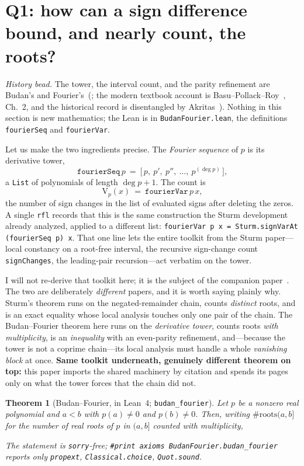 \documentclass[11pt]{article}
\newtheorem{theorem}{Theorem}
\newcommand{\lean}[1]{\texttt{#1}}
\newcommand{\V}{\mathrm{V}}
\newcommand{\keyeq}[1]{\begin{center}\keybox{$\displaystyle #1$}\end{center}}
\begin{document}
\section{Q1: how can a sign difference bound, and nearly count, the roots?}\label{sec:q1}

\emph{History bead.} The tower, the interval count, and the parity refinement are Budan's and
Fourier's~(\cite{budan,fourier}; the modern textbook account is Basu--Pollack--Roy~\cite{bpr}, Ch.~2,
and the historical record is disentangled by Akritas~\cite{akritas}). Nothing in this section is new
mathematics; the Lean is in \lean{BudanFourier.lean}, the definitions \lean{fourierSeq} and
\lean{fourierVar}.

Let us make the two ingredients precise. The \emph{Fourier sequence} of $p$ is its derivative tower,
\[
  \lean{fourierSeq}\,p\ =\ \big[\,p,\ p',\ p'',\ \dots,\ p^{(\deg p)}\,\big],
\]
a \lean{List} of polynomials of length $\deg p + 1$. The count is
\[
  \V_p(x)\ =\ \lean{fourierVar}\,p\,x,
\]
the number of sign changes in the list of evaluated signs after deleting the zeros. A single \lean{rfl}
records that this is the same construction the Sturm development already analyzed, applied to a
different list: \lean{fourierVar p x = Sturm.signVarAt (fourierSeq p) x}. That one line lets the
entire toolkit from the Sturm paper---local constancy on a root-free interval, the recursive
sign-change count \lean{signChanges}, the leading-pair recursion---act verbatim on the tower.

I will not re-derive that toolkit here; it is the subject of the companion paper~\cite{sturmlean}.
The two are deliberately \emph{different} papers, and it is worth saying plainly why. Sturm's theorem
runs on the negated-remainder chain, counts \emph{distinct} roots, and is an exact equality whose
local analysis touches only one pair of the chain. The Budan--Fourier theorem here runs on the
\emph{derivative tower}, counts roots \emph{with multiplicity}, is an \emph{inequality} with an
even-parity refinement, and---because the tower is not a coprime chain---its local analysis must
handle a whole \emph{vanishing block} at once. \textbf{Same toolkit underneath, genuinely different theorem
on top:} this paper imports the shared machinery by citation and spends its pages only on what the
tower forces that the chain did not.

\begin{theorem}[Budan--Fourier, in Lean~4; \lean{budan\_fourier}]\label{thm:bf}
Let $p$ be a nonzero real polynomial and $a<b$ with $p(a)\ne0$ and $p(b)\ne0$. Then, writing
$\#\mathrm{roots}(a,b]$ for the number of real roots of $p$ in $(a,b]$ counted with multiplicity,
\keyeq{\#\mathrm{roots}(a,b]\ \le\ \V_p(a)-\V_p(b)\quad\text{and}\quad
  \V_p(a)-\V_p(b)-\#\mathrm{roots}(a,b]\ \text{is even.}}
The statement is \lean{sorry}-free; \lean{\#print axioms BudanFourier.budan\_fourier} reports only
\lean{propext}, \lean{Classical.choice}, \lean{Quot.sound}.
\end{theorem}
\end{document}
